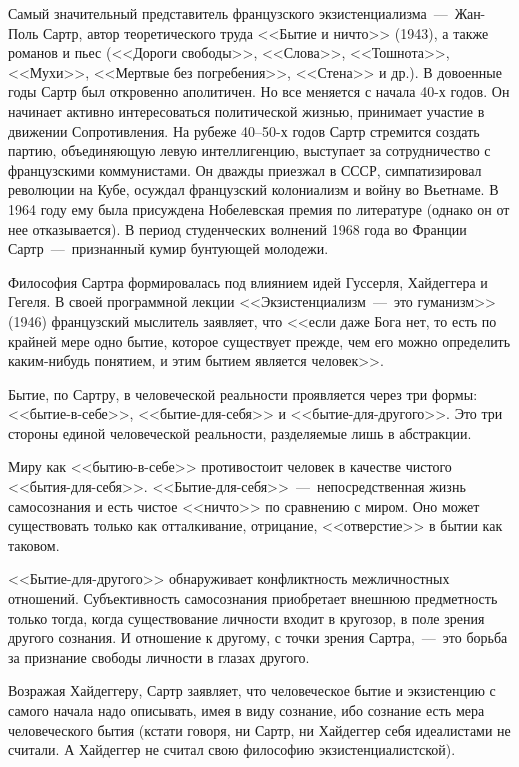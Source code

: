 \documentclass{bmstu}
\begin{document}
Самый значительный представитель французского экзистенциализма~---~Жан-Поль Сартр, автор теоретического труда <<Бытие и ничто>> (1943), а также романов и пьес (<<Дороги свободы>>, <<Слова>>, <<Тошнота>>, <<Мухи>>, <<Мертвые без погребения>>, <<Стена>> и др.). В довоенные годы Сартр был откровенно аполитичен. Но все меняется с начала 40-х годов. Он начинает активно интересоваться политической жизнью, принимает участие в движении Сопротивления. На рубеже 40--50-х годов Сартр стремится создать партию, объединяющую левую интеллигенцию, выступает за сотрудничество с французскими коммунистами. Он дважды приезжал в СССР, симпатизировал революции на Кубе, осуждал французский колониализм и войну во Вьетнаме. В 1964 году ему была присуждена Нобелевская премия по литературе (однако он от нее отказывается). В период студенческих волнений 1968 года во Франции Сартр~---~признанный кумир бунтующей молодежи.

Философия Сартра формировалась под влиянием идей Гуссерля, Хайдеггера и Гегеля. В своей программной лекции <<Экзистенциализм~---~это гуманизм>> (1946) французский мыслитель заявляет, что <<если даже Бога нет, то есть по крайней мере одно бытие, которое существует прежде, чем его можно определить каким-нибудь понятием, и этим бытием является человек>>.

Бытие, по Сартру, в человеческой реальности проявляется через три формы: <<бытие-в-себе>>, <<бытие-для-себя>> и <<бытие-для-другого>>. Это три стороны единой человеческой реальности, разделяемые лишь в абстракции.

Миру как <<бытию-в-себе>> противостоит человек в качестве чистого <<бытия-для-себя>>. <<Бытие-для-себя>>~---~непосредственная жизнь самосознания и есть чистое <<ничто>> по сравнению с миром. Оно может существовать только как отталкивание, отрицание, <<отверстие>> в бытии как таковом.

<<Бытие-для-другого>> обнаруживает конфликтность межличностных отношений. Субъективность самосознания приобретает внешнюю предметность только тогда, когда существование личности входит в кругозор, в поле зрения другого сознания. И отношение к другому, с точки зрения Сартра,~---~это борьба за признание свободы личности в глазах другого.

Возражая Хайдеггеру, Сартр заявляет, что человеческое бытие и экзистенцию с самого начала надо описывать, имея в виду сознание, ибо сознание есть мера человеческого бытия (кстати говоря, ни Сартр, ни Хайдеггер себя идеалистами не считали. А Хайдеггер не считал свою философию экзистенциалистской).
\end{document}
